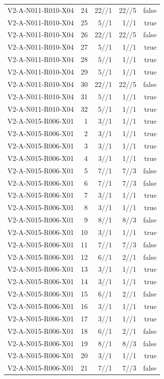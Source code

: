 {\begin{longtable}{lrrrr}
V2-A-N011-R010-X04 & 24 & 22//1 & 22//5 & false \\
V2-A-N011-R010-X04 & 25 & 5//1 & 1//1 & true \\
V2-A-N011-R010-X04 & 26 & 22//1 & 22//5 & false \\
V2-A-N011-R010-X04 & 27 & 5//1 & 1//1 & true \\
V2-A-N011-R010-X04 & 28 & 5//1 & 1//1 & true \\
V2-A-N011-R010-X04 & 29 & 5//1 & 1//1 & true \\
V2-A-N011-R010-X04 & 30 & 22//1 & 22//5 & false \\
V2-A-N011-R010-X04 & 31 & 5//1 & 1//1 & true \\
V2-A-N011-R010-X04 & 32 & 5//1 & 1//1 & true \\
V2-A-N015-R006-X01 & 1 & 3//1 & 1//1 & true \\
V2-A-N015-R006-X01 & 2 & 3//1 & 1//1 & true \\
V2-A-N015-R006-X01 & 3 & 3//1 & 1//1 & true \\
V2-A-N015-R006-X01 & 4 & 3//1 & 1//1 & true \\
V2-A-N015-R006-X01 & 5 & 7//1 & 7//3 & false \\
V2-A-N015-R006-X01 & 6 & 7//1 & 7//3 & false \\
V2-A-N015-R006-X01 & 7 & 3//1 & 1//1 & true \\
V2-A-N015-R006-X01 & 8 & 3//1 & 1//1 & true \\
V2-A-N015-R006-X01 & 9 & 8//1 & 8//3 & false \\
V2-A-N015-R006-X01 & 10 & 3//1 & 1//1 & true \\
V2-A-N015-R006-X01 & 11 & 7//1 & 7//3 & false \\
V2-A-N015-R006-X01 & 12 & 6//1 & 2//1 & false \\
V2-A-N015-R006-X01 & 13 & 3//1 & 1//1 & true \\
V2-A-N015-R006-X01 & 14 & 3//1 & 1//1 & true \\
V2-A-N015-R006-X01 & 15 & 6//1 & 2//1 & false \\
V2-A-N015-R006-X01 & 16 & 3//1 & 1//1 & true \\
V2-A-N015-R006-X01 & 17 & 3//1 & 1//1 & true \\
V2-A-N015-R006-X01 & 18 & 6//1 & 2//1 & false \\
V2-A-N015-R006-X01 & 19 & 8//1 & 8//3 & false \\
V2-A-N015-R006-X01 & 20 & 3//1 & 1//1 & true \\
V2-A-N015-R006-X01 & 21 & 7//1 & 7//3 & false \\

\end{longtable}}
